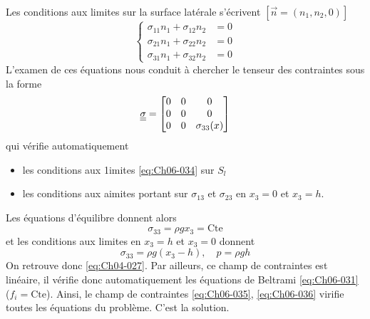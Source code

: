 Les conditions aux limites sur la surface latérale s'écrivent $\left[ \vec{n} = \left( n_1, n_2, 0 \right) \right]$
\begin{equation}
    \left\{
    \begin{aligned}
        \sigma_{11}n_1 + \sigma_{12}n_2 &= 0 \\
        \sigma_{21}n_1 + \sigma_{22}n_2 &= 0 \\
        \sigma_{31}n_1 + \sigma_{32}n_2 &= 0
    \end{aligned}
    \right.
    \label{eq:Ch06-034}
\end{equation}
L'examen de ces équations nous conduit à chercher le tenseur des contraintes sous la forme
\begin{equation}
    \underline{\underline{\sigma}} = 
    \begin{bmatrix}
        0 & 0 & 0 \\
        0 & 0 & 0 \\
        0 & 0 & \sigma_{33}(x)
    \end{bmatrix}
    \label{eq:Ch06-035}
\end{equation}
qui vérifie automatiquement
\begin{itemize}
    \item les conditions aux 1imites \eqref{eq:Ch06-034} sur $S_l$
    \item les conditions aux aimites portant sur $\sigma_{13}$ et $\sigma_{23}$ en $x_3 = 0$ et $x_3 =h$.
\end{itemize}
Les équations d'équilibre donnent alors
\begin{equation*}
    \sigma_{33} = \rho g x_3 = \text{Cte}
\end{equation*}
et les conditions aux limites en $x_3=h$ et $x_3=0$ donnent
\begin{equation}
    \sigma_{33} = \rho g \left( x_3 -h \right), \quad p = \rho g h
    \label{eq:Ch06-036}
\end{equation}
On retrouve donc \eqref{eq:Ch04-027}.
Par ailleurs, ce champ de contraintes est linéaire, il vérifie donc automatiquement les équations de Beltrami \eqref{eq:Ch06-031} ($f_i = \text{Cte}$).
Ainsi, le champ de contraintes \eqref{eq:Ch06-035}, \eqref{eq:Ch06-036} virifie toutes les équations du problème.
C'est la solution.

